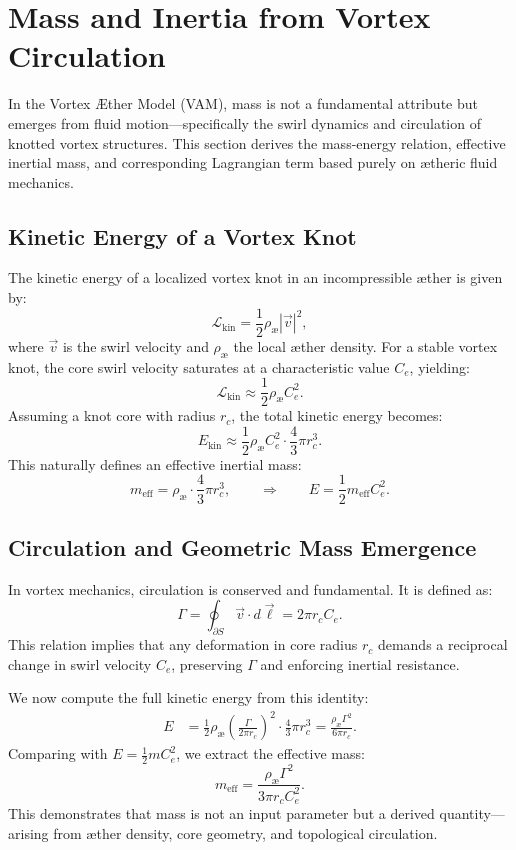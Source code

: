 \section{Mass and Inertia from Vortex Circulation}

In the Vortex Æther Model (VAM), mass is not a fundamental attribute but emerges from fluid motion—specifically the swirl dynamics and circulation of knotted vortex structures. This section derives the mass-energy relation, effective inertial mass, and corresponding Lagrangian term based purely on ætheric fluid mechanics.

\subsection{Kinetic Energy of a Vortex Knot}

The kinetic energy of a localized vortex knot in an incompressible æther is given by:
\begin{equation}
    \mathcal{L}_\text{kin} = \frac{1}{2} \rho_\text{\ae} |\vec{v}|^2,
\end{equation}
where $\vec{v}$ is the swirl velocity and $\rho_\text{\ae}$ the local æther density. For a stable vortex knot, the core swirl velocity saturates at a characteristic value \( C_e \), yielding:
\[
    \mathcal{L}_\text{kin} \approx \frac{1}{2} \rho_\text{\ae} C_e^2.
\]
Assuming a knot core with radius \( r_c \), the total kinetic energy becomes:
\[
    E_\text{kin} \approx \frac{1}{2} \rho_\text{\ae} C_e^2 \cdot \frac{4}{3} \pi r_c^3.
\]
This naturally defines an effective inertial mass:
\[
    m_\text{eff} = \rho_\text{\ae} \cdot \frac{4}{3} \pi r_c^3,
    \qquad \Rightarrow \qquad E = \frac{1}{2} m_\text{eff} C_e^2.
\]

\subsection{Circulation and Geometric Mass Emergence}

In vortex mechanics, circulation is conserved and fundamental. It is defined as:
\begin{equation}
    \Gamma = \oint_{\partial S} \vec{v} \cdot d\vec{\ell} = 2\pi r_c C_e.
\end{equation}
This relation implies that any deformation in core radius \( r_c \) demands a reciprocal change in swirl velocity \( C_e \), preserving $\Gamma$ and enforcing inertial resistance.

We now compute the full kinetic energy from this identity:
\begin{align}
    E &= \frac{1}{2} \rho_\text{\ae} \left( \frac{\Gamma}{2\pi r_c} \right)^2 \cdot \frac{4}{3} \pi r_c^3
      = \frac{\rho_\text{\ae} \Gamma^2}{6\pi r_c}.
\end{align}
Comparing with \( E = \frac{1}{2} m C_e^2 \), we extract the effective mass:
\begin{equation}
    m_\text{eff} = \frac{\rho_\text{\ae} \Gamma^2}{3\pi r_c C_e^2}.
\end{equation}
This demonstrates that mass is not an input parameter but a derived quantity—arising from æther density, core geometry, and topological circulation.

